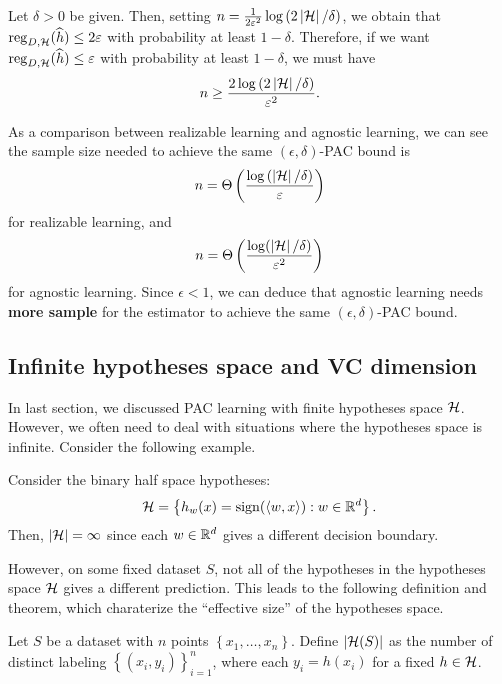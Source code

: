 \documentclass[a4paper]{article}
\begin{document}
\begin{cor}
Let $\delta > 0$ be given. Then,
setting
$n = \frac{1}{2\varepsilon^2} \log \left( 2 \left\lvert \mathcal{H}\right\rvert /
\delta \right)$, we obtain that $\operatorname{reg}_{D, \mathcal{H}} (\widehat{h})
\leq 2\varepsilon$ with probability at least $1 - \delta$.
Therefore, if we want $\operatorname{reg}_{D, \mathcal{H}}
(\widehat{h}) \leq \varepsilon$ with probability at least $1 -
\delta$, we must have
\[
  n \geq \frac{2 \log
  \left( 2 \left\lvert \mathcal{H}\right\rvert / \delta \right)}
  {\varepsilon^2}.
\]
\end{cor}

As a comparison between realizable learning and agnostic
learning, we can see the sample size needed to
achieve the same $(\epsilon, \delta)$-PAC bound is
\[
n = \Theta \left( \frac{\log \left( \left\lvert \mathcal{H}\right\rvert / \delta
\right)}{\varepsilon} \right)
\]
for realizable learning, and
\[
n = \Theta \left( \frac{\log(\left\lvert \mathcal{H}\right\rvert / \delta)}{\varepsilon^2}
\right)
\]
for agnostic learning. Since $\epsilon < 1$,
we can deduce that agnostic learning needs
\textbf{more sample} for the estimator to achieve the
same $(\epsilon, \delta)$-PAC bound.

\subsection{Infinite hypotheses space and VC dimension}

In last section, we discussed PAC learning with finite
hypotheses space $\mathcal{H}$. However, we often need
to deal with situations where the hypotheses space
is infinite. Consider the following example.

\begin{eg}
  Consider the binary half space hypotheses:
  \[
  \mathcal{H} = \left\{ h_w(x) =
  \operatorname{sign}(\left\langle w, x \right\rangle) : w \in \mathbb{R}^d \right\}.
  \]
  Then, $\left\lvert \mathcal{H}\right\rvert = \infty$ since each
  $w \in \mathbb{R}^d$ gives a different decision boundary.
\end{eg}

However, on some fixed dataset $S$, not all of the hypotheses
in the hypotheses space $\mathcal{H}$ gives a different prediction.
This leads to the following definition and theorem, which
charaterize the ``effective size'' of the hypotheses
space.

\begin{defi}
  Let $S$ be a dataset with $n$ points
  $\left\{ x_1, \dots, x_n \right\}$. Define
  $\left\lvert \mathcal{H}(S)\right\rvert$ as the number of distinct labeling
  $\left\{ (x_i, y_i) \right\}_{i=1}^n$, where each
  $y_i = h(x_i)$ for a fixed $h \in \mathcal{H}$.
\end{defi}
\end{document}
